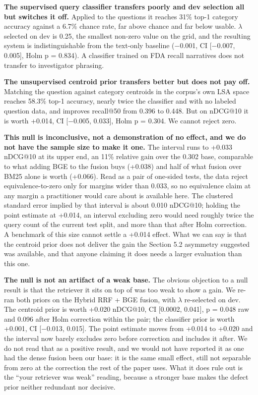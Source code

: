 \documentclass[acmsmall]{acmart}
\begin{document}
\textbf{The supervised query classifier transfers poorly and dev selection all but switches it off.} Applied to the questions it reaches 31\% top-1 category accuracy against a 6.7\% chance rate, far above chance and far below usable. $\lambda$ selected on dev is 0.25, the smallest non-zero value on the grid, and the resulting system is indistinguishable from the text-only baseline ($-$0.001, CI [$-$0.007, 0.005], Holm p = 0.834). A classifier trained on FDA recall narratives does not transfer to investigator phrasing.

\textbf{The unsupervised centroid prior transfers better but does not pay off.} Matching the question against category centroids in the corpus's own LSA space reaches 58.3\% top-1 accuracy, nearly twice the classifier and with no labeled question data, and improves recall@50 from 0.396 to 0.448. But on nDCG@10 it is worth +0.014, CI [$-$0.005, 0.033], Holm p = 0.304. We cannot reject zero.

\textbf{This null is inconclusive, not a demonstration of no effect, and we do not have the sample size to make it one.} The interval runs to +0.033 nDCG@10 at its upper end, an 11\% relative gain over the 0.302 base, comparable to what adding BGE to the fusion buys (+0.038) and half of what fusion over BM25 alone is worth (+0.066). Read as a pair of one-sided tests, the data reject equivalence-to-zero only for margins wider than 0.033, so no equivalence claim at any margin a practitioner would care about is available here. The clustered standard error implied by that interval is about 0.010 nDCG@10; holding the point estimate at +0.014, an interval excluding zero would need roughly twice the query count of the current test split, and more than that after Holm correction. A benchmark of this size cannot settle a +0.014 effect. What we can say is that the centroid prior does not deliver the gain the Section 5.2 asymmetry suggested was available, and that anyone claiming it does needs a larger evaluation than this one.

\textbf{The null is not an artifact of a weak base.} The obvious objection to a null result is that the retriever it sits on top of was too weak to show a gain. We re-ran both priors on the Hybrid RRF + BGE fusion, with $\lambda$ re-selected on dev. The centroid prior is worth +0.020 nDCG@10, CI [0.0002, 0.041], p = 0.048 raw and 0.096 after Holm correction within the pair; the classifier prior is worth +0.001, CI [$-$0.013, 0.015]. The point estimate moves from +0.014 to +0.020 and the interval now barely excludes zero before correction and includes it after. We do not read that as a positive result, and we would not have reported it as one had the dense fusion been our base: it is the same small effect, still not separable from zero at the correction the rest of the paper uses. What it does rule out is the ``your retriever was weak'' reading, because a stronger base makes the defect prior neither redundant nor decisive.
\end{document}
